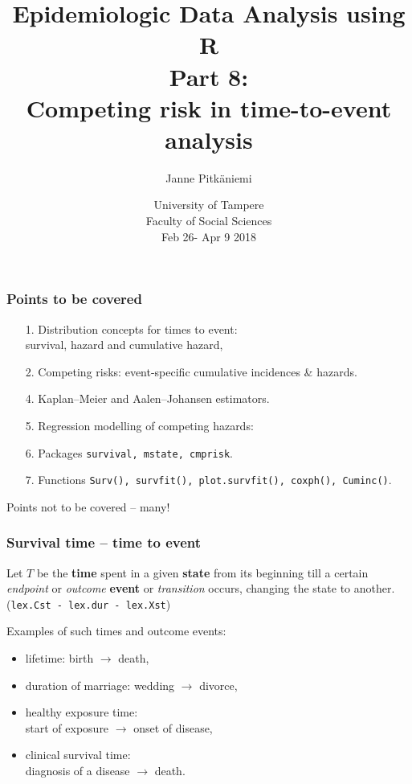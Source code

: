 \documentclass[handout,12pt]{beamer}
\title{Epidemiologic Data Analysis using R \\
Part 8:\\  Competing risk in time-to-event analysis}  %
\author{Janne Pitk\"aniemi}
\institute{Finnish Cancer Registry, Finland,   
 \texttt{<janne.pitkaniemi@cancer.fi>} \\ }
\date{University of Tampere \\Faculty of Social Sciences \\ %
Feb 26- Apr 9  2018}
\begin{document}
\maketitle


\begin{frame}
\frametitle{Points to be covered}

\begin{itemize}
\item[1.] 
Distribution concepts for times to event: \\ 
 survival, hazard and cumulative hazard,
 \medskip
 \item[2.] 
 Competing risks: event-specific cumulative incidences \& hazards.
 \medskip
\item[4.] Kaplan--Meier and Aalen--Johansen estimators.
 \medskip
 \item[5.] 
 Regression modelling of competing hazards:
 \medskip
 \item[6.]
 Packages \texttt{survival, mstate, cmprisk}.
\medskip
\item[7.] 
 Functions \texttt{Surv(), survfit(), plot.survfit(), coxph(), Cuminc()}.
\end{itemize}

Points not to be covered -- many!

\end{frame}


\begin{frame}
\frametitle{Survival time -- time to event}

Let $T$ be the \textbf{time} spent in a given \textbf{state} from its 
beginning till a certain \textit{endpoint} or \textit{outcome} \textbf{event} or \textit{transition}
 occurs, changing the state to another. \\
 (\texttt{lex.Cst - lex.dur - lex.Xst})

\bigskip
Examples of such times and outcome events:
\begin{itemize}
\item lifetime: birth $\rightarrow$ death,
\medskip
\item duration of marriage: wedding $\to$ divorce, 
\medskip
\item healthy exposure time: \\ start of exposure  
  $\rightarrow$ onset of disease,
  \medskip
\item clinical survival time: \\
 diagnosis of a disease  $\rightarrow$ death.
\end{itemize}


\end{frame}
\end{document}
